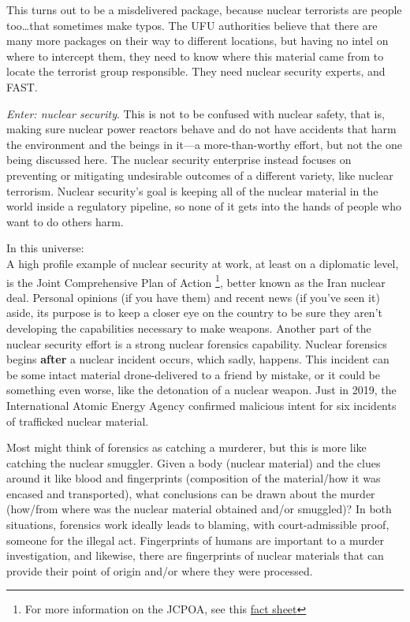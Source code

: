 {\begin{shadequote} 

  This turns out to be a misdelivered package, because nuclear terrorists are
  people too\ldots that sometimes make typos. The UFU authorities believe that
  there are many more packages on their way to different locations, but having
  no intel on where to intercept them, they need to know where this material
  came from to locate the terrorist group responsible. They need nuclear
  security experts, and FAST.

\end{shadequote}

\narr \textit{Enter: nuclear security}. This is not to be confused with nuclear
safety, that is, making sure nuclear power reactors behave and do not have
accidents that harm the environment and the beings in it---a more-than-worthy
effort, but not the one being discussed here. The nuclear security enterprise
instead focuses on preventing or mitigating undesirable outcomes of a different
variety, like nuclear terrorism. Nuclear security's goal is keeping all of the
nuclear material in the world inside a regulatory pipeline, so none of it gets
into the hands of people who want to do others harm.

\noindent In this universe:\\ A high profile example of nuclear security at
work, at least on a diplomatic level, is the Joint Comprehensive Plan of Action
\footnote{For more information on the JCPOA, see this
\href{https://www.armscontrol.org/factsheets/JCPOA-at-a-glance}{\color{blue}fact
sheet}}, better known as the Iran nuclear deal. Personal opinions (if you have
them) and recent news (if you've seen it) aside, its purpose is to keep a
closer eye on the country to be sure they aren't developing the capabilities
necessary to make weapons.  Another part of the nuclear security effort is a
strong nuclear forensics capability.  Nuclear forensics begins \textbf{after} a
nuclear incident occurs, which sadly, happens. This incident can be some intact
material drone-delivered to a friend by mistake, or it could be something even
worse, like the detonation of a nuclear weapon. Just in 2019, the International
Atomic Energy Agency confirmed malicious intent for six incidents of trafficked
nuclear material.

Most might think of forensics as catching a murderer, but this is more like
catching the nuclear smuggler. Given a body (nuclear material) and the clues
around it like blood and fingerprints (composition of the material\slash how it
was encased and transported), what conclusions can be drawn about the murder
(how\slash from where was the nuclear material obtained and\slash or smuggled)?
In both situations, forensics work ideally leads to blaming, with
court-admissible proof, someone for the illegal act. Fingerprints of humans are
important to a murder investigation, and likewise, there are fingerprints of
nuclear materials that can provide their point of origin and\slash or where
they were processed.

}
